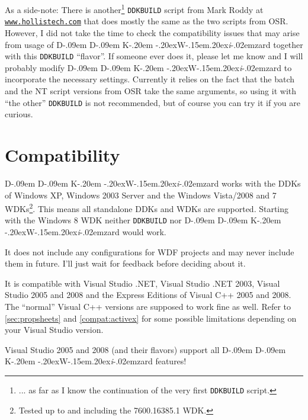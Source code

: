 \documentclass[a4paper,titlepage]{report}
\newcommand{\linkclr}[1]{\textcolor[rgb]{0.00,0.00,0.60}{#1}}
\newcommand{\extlinktt}[2]{\href{#1}{\texttt{\linkclr{#2}}}}
\def\ddkwiz{\texorpdfstring{D\kern-.09em D\kern-.09em K\kern-.20em \raise-.20ex\hbox{W}\kern-.15em\raise.20ex\hbox{\it{i}}\kern-.02em{zard}}{DDKWizard}}
\begin{document}
As a side-note: There is another\footnote{... as far as I know the continuation of
the very first \texttt{DDKBUILD} script.} \texttt{DDKBUILD} script from Mark Roddy at
\extlinktt{http://www.hollistech.com}{www.hollistech.com}
that does mostly the same as the two scripts from OSR. However, I did not take the time
to check the compatibility issues that may arise from usage of \ddkwiz{} together
with this \texttt{DDKBUILD} ``flavor''. If someone ever does it, please let me know
and I will probably modify \ddkwiz{} to incorporate the necessary
settings. Currently it relies on the fact that the batch and the NT script
versions from OSR take the same arguments, so using it with ``the other''
\texttt{DDKBUILD} is not recommended, but of course you can try it if you are curious.

\section*{Compatibility}
\ddkwiz{} works with the DDKs of Windows XP, Windows 2003 Server and the Windows Vista/2008
and 7 WDKs\footnote{Tested up to and including the 7600.16385.1 WDK.}.
This means all standalone DDKs and WDKs are supported. Starting with the Windows 8 WDK
neither \texttt{DDKBUILD} nor \ddkwiz{} would work.

It does not include any configurations for WDF projects and may never include
them in future. I'll just wait for feedback before deciding about it.

It is compatible with Visual Studio .NET, Visual Studio .NET 2003, Visual Studio 2005
and 2008 and the Express Editions of Visual C++ 2005 and 2008. The ``normal''
Visual C++ versions are supposed to work fine as well. Refer to \autoref{sec:propsheets}
and \autoref{compat:activex} for some possible limitations depending
on your Visual Studio version.

Visual Studio 2005 and 2008 (and their flavors) support all \ddkwiz{} features!
\end{document}
